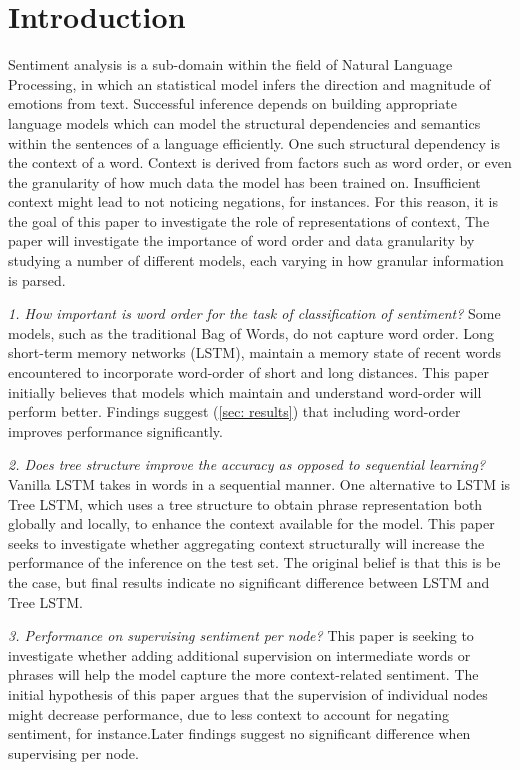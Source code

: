 \section{Introduction}
\label{sec: intro}
Sentiment analysis is a sub-domain within the field of Natural Language
Processing, in which an statistical model infers the direction and magnitude of
emotions from text. Successful inference depends on building appropriate
language models which can model the structural dependencies and semantics within
the sentences of a language efficiently. One such structural dependency is the
context of a word. Context is derived from factors such as word order, or even
the granularity of how much data the model has been trained on. Insufficient
context might lead to not noticing negations, for instances. For this reason, it
is the goal of this paper to investigate the role of representations of context,
The paper will investigate the importance of word order and data granularity by
studying a number of different models, each varying in how granular information
is parsed.

    \textit{1. How important is word order for the task of classification of
    sentiment?} Some models, such as the traditional Bag of Words, do not
    capture word order. Long short-term memory networks (LSTM), maintain a
    memory state of recent words encountered to incorporate word-order of short
    and long distances. This paper initially believes that models which maintain
    and understand word-order will perform better. Findings suggest (\ref{sec:
    results}) that including word-order improves performance significantly.

    \textit{2. Does tree structure improve the accuracy as opposed to sequential
    learning?} Vanilla LSTM takes in words in a sequential manner. One
    alternative to LSTM is Tree LSTM, which uses a tree structure to obtain
    phrase representation both globally and locally, to enhance the context
    available for the model. This paper seeks to investigate whether aggregating
    context structurally will increase the performance of the inference on the
    test set. The original belief is that this is be the case, but final results
    indicate no significant difference between LSTM and Tree LSTM.
    
    \textit{3. Performance on supervising sentiment per node?}
    This paper is seeking to investigate whether adding additional supervision
    on intermediate words or phrases will help the model capture the more
    context-related sentiment. The initial hypothesis of this paper argues that the
    supervision of individual nodes might decrease performance, due to less context
    to account for negating sentiment, for instance.Later findings suggest no
    significant difference when supervising per node.

